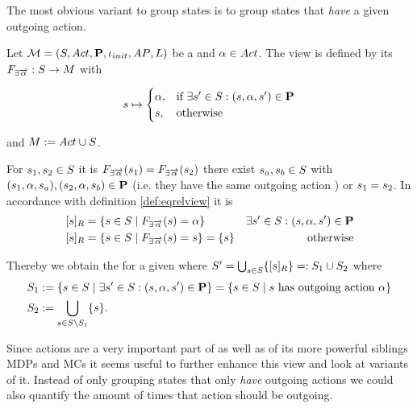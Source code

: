 \documentclass[preview]{standalone}
\begin{document}
The most obvious variant to group states is to group states that \emph{have} a given outgoing action. 

\begin{definition}
	Let ${{{\mathcal{M}}}} = {{({S}, {Act}, {\textbf{P}}, {\iota_{init}}, {AP}, {L})}}$ be a \chosengraphtypeN and ${\alpha} \in {Act}$. The view \viewhasoutaction is defined by its \grpfctN ${{{{F}}_{\exists{\overrightarrow{\ensuremath{{\alpha}}}}}}} : {S} \to {\ensuremath{{M}}}$ with 
	
	\[
	{s} \mapsto
	\begin{cases}
		{\alpha},				& \text{if } \exists {s}' \in {S}: ({s}, {\alpha}, {s}') \in {\ensuremath{{\textbf{P}}}} \\
		{s},          	& \text{otherwise}
	\end{cases}
	\]
	
	and ${{M}} := {{Act} \cup {S}}$.	
\end{definition}


For ${s}_1,{s}_2 \in {S}$ it is ${{{{F}}_{\exists{\overrightarrow{\ensuremath{{\alpha}}}}}}}({s}_1) = {{{{F}}_{\exists{\overrightarrow{\ensuremath{{\alpha}}}}}}}({s}_2)$ \iffN 
there exist ${s}_{a},{s}_{b} \in {S}$ with 
$({s}_1, {\alpha}, {s}_{a}), ({s}_2, {\alpha}, {s}_{b}) \in {\ensuremath{{\textbf{P}}}}$ (i.e. they have the same outgoing action \action) or ${s}_1 = {s}_2$. 
In accordance with definition \ref{def:eqrelview} it is
\begin{align*}
	\eqclassv{\state} &= \{\state \in \states \mid \gfcthasoutaction(\state) = \action\} &\exists\state' \in \states : (\state, \action, \state') \in \trans \\
	\eqclassv{\state} &= \{\state \in \states \mid \gfcthasoutaction(\state) = \state\} = \{s\} &\text{ otherwise}
\end{align*}

Thereby we obtain the \viewN \viewhasoutaction for a given \chosengraphtypeN \chgph where ${S}' = \bigcup_{{s} \in {S}} \{{{[{s}]_{{R}}}}\} =: {S}_1 \cup {S}_2$ where
\begin{align*}
	 {S}_1 &:= \{{s} \in {S} \mid \exists {s}' \in {S}: ({s}, {\alpha}, {s}') \in {\ensuremath{{\textbf{P}}}}\} = \{{s} \in {S} \mid {s} \text{ has outgoing action \ensuremath{{\alpha}}}\} \\
	{S}_2 &:= {\bigcup_{{s} \in {S} \setminus {S}_1}\{{s}\}}.
\end{align*}


Since actions are a very important part of \chosengraphtypesN as well as of its more powerful siblings MDPs and MCs it seems useful to further enhance this view and look at variants of it. Instead of only grouping states that only \emph{have} outgoing actions we could also quantify the amount of times that action should be outgoing.
\end{document}
